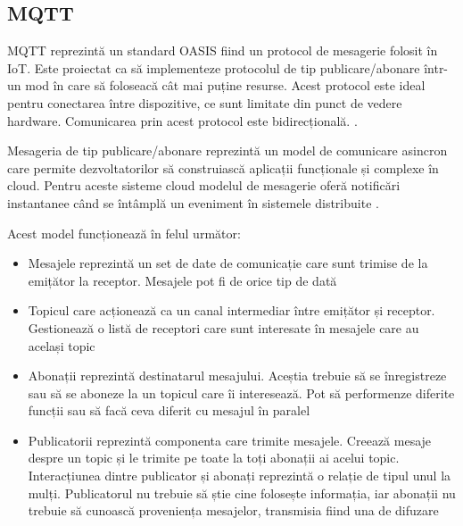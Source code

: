 \subsection{MQTT}

MQTT reprezintă un standard  OASIS fiind un protocol de mesagerie folosit în IoT. Este proiectat ca să implementeze protocolul de tip publicare/abonare într-un mod în care să foloseacă cât mai puține resurse. Acest protocol este ideal pentru conectarea între dispozitive, ce sunt limitate din punct de vedere hardware. Comunicarea prin acest protocol este bidirecțională. \cite{MQTT}.


Mesageria de tip publicare/abonare reprezintă un model de comunicare asincron care permite dezvoltatorilor să construiască aplicații funcționale și complexe în cloud. Pentru aceste sisteme cloud modelul de mesagerie oferă notificări instantanee când se întâmplă un eveniment în sistemele distribuite \cite{ps}.

Acest model funcționează în felul următor:
\begin{itemize}
	\item Mesajele reprezintă un set de date de comunicație care sunt trimise de la emițător la receptor. Mesajele pot fi de orice tip de dată \cite{ps}
	\item Topicul care acționează ca un canal intermediar între emițător și receptor. Gestionează o listă de receptori care sunt interesate în mesajele care au același topic \cite{ps}
	\item Abonații reprezintă destinatarul mesajului. Aceștia trebuie să se înregistreze sau să se aboneze la un topicul care îi interesează. Pot să performenze diferite funcții sau să facă ceva diferit cu mesajul în paralel \cite{ps}
	\item Publicatorii reprezintă componenta care trimite mesajele. Creează mesaje despre un topic și le trimite pe toate la toți abonații ai acelui topic. Interacțiunea dintre publicator și abonați reprezintă o relație de tipul unul la mulți. Publicatorul nu trebuie să știe cine folosește informația, iar abonații nu trebuie să cunoască proveniența mesajelor, transmisia fiind una de difuzare \cite{ps}
\end{itemize}

